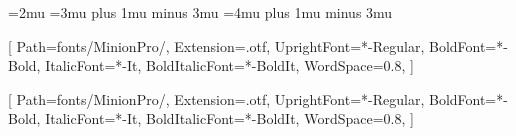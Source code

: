 \usepackage[no-math]{fontspec}
\usepackage{kpfonts}
\usepackage[T1]{fontenc}
\usepackage[english,ngerman]{babel}

\usepackage[document]{ragged2e}

\usepackage[useregional=numeric]{datetime2}

\usepackage{ifthen}
\usepackage{calc}

\setlength\columnsep{10pt}%
\usepackage{setspace}
\thinmuskip=2mu                     %
\medmuskip=3mu plus 1mu minus 3mu   %
\thickmuskip=4mu plus 1mu minus 3mu %
\setlength\arraycolsep{1pt}

\usepackage{enumitem}

\usepackage{multicol, multirow, tabularx}
\usepackage{makecell}
\usepackage{ulem} %

\usepackage{graphicx}

\DeclareTextFontCommand{\emph}{\color{MediumOrchid}\bfseries\sffamily}




[%
    Path=fonts/MinionPro/,
    Extension=.otf,
    UprightFont=*-Regular,
    BoldFont=*-Bold,
    ItalicFont=*-It,
    BoldItalicFont=*-BoldIt,
    WordSpace=0.8,
]

\setmainfont{MinionPro}[%
    Path=fonts/MinionPro/,
    Extension=.otf,
    UprightFont=*-Regular,
    BoldFont=*-Bold,
    ItalicFont=*-It,
    BoldItalicFont=*-BoldIt,
    WordSpace=0.8,
]
\setsansfont[LetterSpace=-1.8,WordSpace=0.8,Scale=0.95]{Open Sans}
\setmonofont[LetterSpace=-1.0,WordSpace=0.8]{Source Code Pro}



